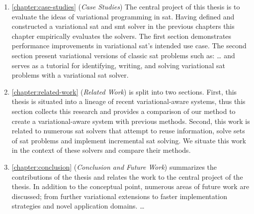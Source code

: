 \begin{enumerate}
  \item \autoref{chapter:case-studies} (\emph{Case Studies}) The central project
    of this thesis is to evaluate the ideas of variational programming in
    \acl{sat}. Having defined and constructed a variational \ac{sat} and
    \ac{smt} solver in the previous chapters this chapter empirically evaluates
    the solvers. The first section demonstrates performance improvements in
    variational \ac{sat}'s intended use case. The second section present
    variational versions of classic \ac{sat} problems such as: \ldots{} and serves as a tutorial for identifying,
    writing, and solving variational \ac{sat} problems with a variational
    \ac{sat} solver.

  \item \autoref{chapter:related-work} (\emph{Related Work}) is split into two
    sections. First, this thesis is situated into a lineage of recent
    variational-aware systems, thus this section collects this research and
    provides a comparison of our method to create a variational-aware system
    with previous methods. Second, this work is related to numerous \ac{sat}
    solvers that attempt to reuse information, solve sets of \ac{sat} problems
    and implement incremental \ac{sat} solving. We situate this work in the
    context of these solvers and compare their methods.

  \item \autoref{chapter:conclusion} (\emph{Conclusion and Future Work}) summarizes the contributions of
    the thesis and relates the work to the central project of the thesis. In
    addition to the conceptual point, numerous areas of future work are
    discussed; from further variational extensions to faster implementation
    strategies and novel application domains. \ldots{}
  \end{enumerate}


